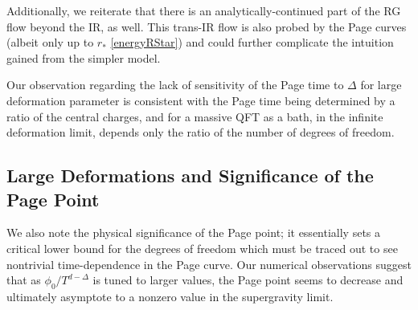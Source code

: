 \documentclass[12pt,a4paper]{article}
\newcommand{\sanjit}[1]{\textcolor{red}{\textbf{??SS:} #1}}
\begin{document}

\noindent Additionally, we reiterate that there is an analytically-continued part of the RG flow beyond the IR, as well. This trans-IR flow is also probed by the Page curves (albeit only up to $r_*$ \eqref{energyRStar}) and could further complicate the intuition gained from the simpler model.

Our observation regarding the lack of sensitivity of the Page time to $\Delta$ for large deformation parameter is consistent with the Page time being determined by a ratio of the central charges, and for a massive QFT as a bath, in the infinite deformation limit, depends only the ratio of the number of degrees of freedom.


\subsection*{Large Deformations and Significance of the Page Point}

We also note the physical significance of the Page point; it essentially sets a critical lower bound for the degrees of freedom which must be traced out to see nontrivial time-dependence in the Page curve. Our numerical observations suggest that as $\phi_0/T^{d-\Delta}$ is tuned to larger values, the Page point seems to decrease and ultimately asymptote to a nonzero value in the supergravity limit.
\end{document}
